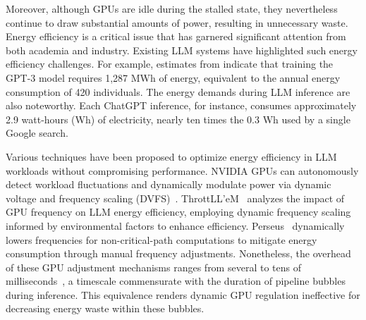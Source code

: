 Moreover, although GPUs are idle during the stalled state, they nevertheless continue to draw substantial amounts of power, resulting in unnecessary waste.
Energy efficiency is a critical issue that has garnered significant attention from both academia and industry. 
Existing LLM systems have highlighted such energy efficiency challenges. 
For example, estimates from \cite{patterson2021carbon} indicate that training the GPT-3 model requires 1,287 MWh of energy, equivalent to the annual energy consumption of 420 individuals. 
The energy demands during LLM inference are also noteworthy. Each ChatGPT inference, for instance, consumes approximately 2.9 watt-hours (Wh) of electricity, nearly ten times the 0.3 Wh used by a single Google search\cite{shi2024efficient}.



Various techniques have been proposed to optimize energy efficiency in LLM workloads without compromising performance.
NVIDIA GPUs can autonomously detect workload fluctuations and dynamically modulate power via dynamic voltage and frequency scaling (DVFS)~\cite{nvidia}. 
ThrottLL'eM~\cite{kakolyris2025throttll} analyzes the impact of GPU frequency on LLM  energy efficiency, employing dynamic frequency scaling informed by environmental factors to enhance efficiency. 
Perseus~\cite{chung2024reducing} dynamically lowers frequencies for non-critical-path computations to mitigate energy consumption through manual frequency adjustments. 
Nonetheless, the overhead of these GPU adjustment mechanisms ranges from several to tens of milliseconds~\cite{chen2023joss}, a timescale commensurate with the duration of pipeline bubbles during inference. 
This equivalence renders dynamic GPU regulation ineffective for decreasing energy waste within these bubbles.




